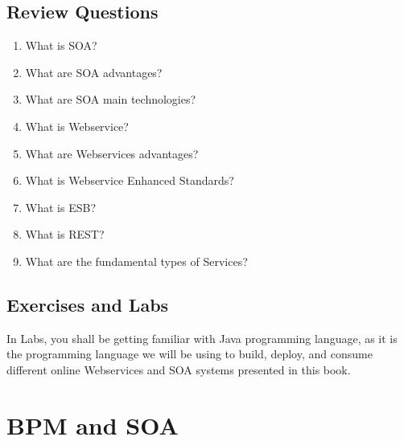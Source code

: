 \documentclass[12pt,a4paper,final,twoside,onecolumn,titlepage]{book}
\begin{document}
\section{Review Questions}
\begin{enumerate}
\item What is \gls{SOA}?
\item What are \gls{SOA} advantages?
\item What are \gls{SOA} main technologies?
\item What is Webservice?
\item What are Webservices advantages?
\item What is Webservice Enhanced Standards?
\item What is \gls{ESB}?
\item What is REST?
\item What are the fundamental types of Services?
\end{enumerate}

\section{Exercises and Labs}
In Labs, you shall be getting familiar with Java programming language, as it is the programming language we will be using to build, deploy, and consume different online Webservices and \gls{SOA} systems presented in this book.


\chapter{BPM and SOA}
\label{BPMandSOA}
\end{document}
